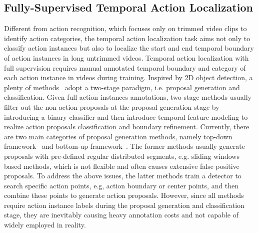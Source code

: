 \documentclass[journal,comsoc]{IEEEtran}
\begin{document}
\subsection{Fully-Supervised Temporal Action Localization}
\par Different from action recognition, which focuses only on trimmed video clips to identify action categories, the temporal action localization task aims not only to classify action instances but also to localize the start and end temporal boundary of action instances in long untrimmed videos. Temporal action localization with full supervision requires manual annotated temporal boundary and category of each action instance in videos during training. Inspired by 2D object detection, a plenty of methods~\cite{TCNN,CDC,TURN_TAP,SSN,BSN,rethinking_faster_rcnn,BMN,GTAD,BSN++} adopt a two-stage paradigm, i.e. proposal generation and classification. Given full action instances annotations, two-stage methods usually filter out the non-action proposals at the proposal generation stage by introducing a binary classifier and then introduce temporal feature modeling to realize action proposals classification and boundary refinement. Currently, there are two main categories of proposal generation methods, namely top-down framework~\cite{TCNN,CDC,TURN_TAP,rethinking_faster_rcnn,GTAD} and bottom-up framework~\cite{SSN,BSN,BMN,BSN++}. The former methods usually generate proposals with pre-defined regular distributed segments, e.g. sliding windows based methods, which is not flexible and often causes extensive false positive proposals. To address the above issues, the latter methods train a detector to search specific action points, e.g, action boundary or center points, and then combine these points to generate action proposals. However, since all methods require action instance labels during the proposal generation and classification stage, they are inevitably causing heavy annotation costs and not capable of widely employed in reality.
\end{document}
